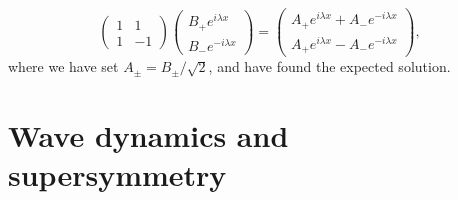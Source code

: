 \begin{example}
\begin{equation}
\begin{pmatrix}
    1 & 1\\
    1 & -1
  \end{pmatrix}
  \begin{pmatrix}
    B_{+}e^{i\lambda x}\\
    B_{-}e^{-i\lambda x}
  \end{pmatrix}
  =
  \begin{pmatrix}
    A_{+}e^{i\lambda x} + A_{-}e^{-i\lambda x}\\
    A_{+}e^{i\lambda x} - A_{-}e^{-i\lambda x}
  \end{pmatrix},
\end{equation}
%
where we have set $A_{\pm} = B_{\pm}/\sqrt{2}$, and have found the expected solution.
\end{example}

\section{Wave dynamics and supersymmetry}

